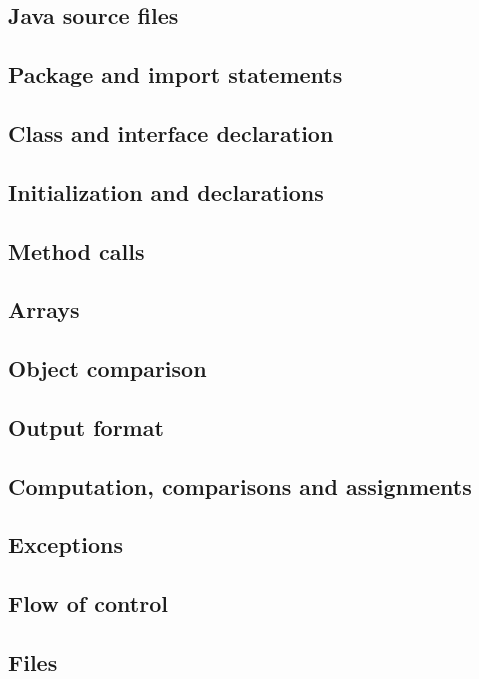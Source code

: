 \subsection*{Java source files}

\subsection*{Package and import statements}

\subsection*{Class and interface declaration}

\subsection*{Initialization and declarations}

\subsection*{Method calls}

\subsection*{Arrays}

\subsection*{Object comparison}

\subsection*{Output format}

\subsection*{Computation, comparisons and assignments}

\subsection*{Exceptions}

\subsection*{Flow of control}

\subsection*{Files}
